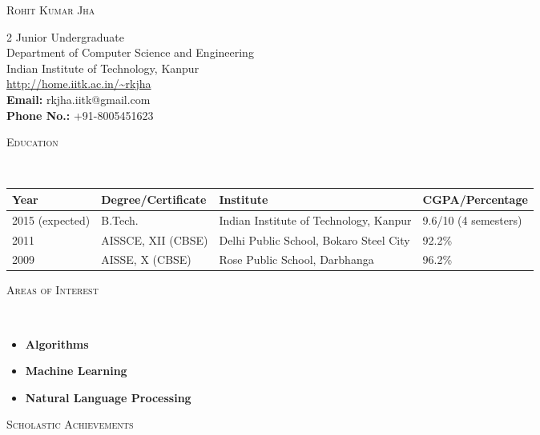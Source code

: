 \documentclass[9pt]{article}
\newenvironment{changemargin}[2]{%
  \begin{list}{}{%
    \setlength{\topsep}{0pt}%
    \setlength{\leftmargin}{#1}%
    \setlength{\rightmargin}{#2}%
    \setlength{\listparindent}{\parindent}%
    \setlength{\itemindent}{\parindent}%
    \setlength{\parsep}{\parskip}%
  }%
  \item[]}{\end{list}
}
\newcommand{\lineover}{
	\begin{changemargin}{-0.05in}{-0.10in}
		\vspace*{-8pt}
		\hrulefill \\
		\vspace*{-2pt}
	\end{changemargin}
}
\newcommand{\header}[1]{
	\begin{changemargin}{-0.75in}{-0.75in}
		\scshape{#1}\\
  	\lineover
	\end{changemargin}
}
\newcommand{\name}[1]{
	\begin{changemargin}{-0.6in}{-0.6in}
		\begin{center}
			{\Large \scshape {#1}}
		\end{center}
	\end{changemargin}
}
\newcommand{\contact}[6]{
	\begin{changemargin}{-0.65in}{-0.65in}
		\begin{multicols}{2}
			{#1}\\ \smallskip 
			{#2}\\ \smallskip
			{#3}\\ \smallskip
			{#4}\\ \smallskip 
			{#5}\\ \smallskip
			{#6}
		\end{multicols}
	\end{changemargin}
}
\newenvironment{body} {
	\vspace*{-16pt}
	\begin{changemargin}{-0.6in}{-0.65in}
  }	
	{\end{changemargin}
}
\begin{document}
\name{Rohit Kumar Jha}

\contact{Junior Undergraduate}{Department of Computer Science and Engineering}{Indian Institute of Technology, Kanpur}{\hspace{60pt} \url{http://home.iitk.ac.in/~rkjha}}{\hspace{60pt} \textbf{Email:} rkjha.iitk@gmail.com}{\hspace{60pt} \textbf{Phone No.:} +91-8005451623}

\header{Education}

\vspace{6pt}
	\begin{tabular}{ | l | l | l | l | }
	\hline	
	\textbf{Year} & \textbf{Degree/Certificate} & \textbf{Institute} & \textbf{CGPA/Percentage} \\ \hline
	2015 (expected) & B.Tech. & Indian Institute of Technology, Kanpur & 9.6/10 (4 semesters) \\ \hline
	2011 & AISSCE, XII (CBSE) & Delhi Public School, Bokaro Steel City & 92.2\% \\ \hline
	2009 & AISSE, X (CBSE) & Rose Public School, Darbhanga & 96.2\% \\ \hline
	\end{tabular}

\smallskip

\header{Areas of Interest}

\begin{body}
	\vspace{14pt}
	\begin{itemize}
		\item{\textbf{Algorithms}}
		\item{\textbf{Machine Learning}}
		\item{\textbf{Natural Language Processing}}
	\end{itemize}
\end{body}

\header{Scholastic Achievements}
\end{document}
